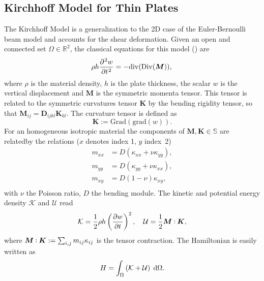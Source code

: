 \documentclass[letterpaper, 10 pt, conference]{ieeeconf}
\def\onedot{$\mathsurround0pt\ldotp$}
\def\cddot{%
	\mathbin{\vcenter{\baselineskip.67ex
			\hbox{\onedot}\hbox{\onedot}}%
}}
\begin{document}
\subsection{Kirchhoff Model for Thin Plates}
\label{subsec:classMin}
The Kirchhoff Model is a generalization to the 2D case of the Euler-Bernoulli beam model and accounts for the shear deformation. Given an open and connected set $\Omega \in \mathbb{R}^2$, the classical equations for this model (\cite{timoshenko1959theory}) are 
\begin{equation}
\displaystyle \rho h \diffp[2]{w}{t} = -\mathrm{div}(\mathrm{Div}(\bm{M})), \\
\end{equation}
where $\rho$ is the material density, $h$ is the plate thickness, the scalar $w$ is the vertical displacement and $\bm{M}$ is the symmetric momenta tensor.  This tensor is related to the symmetric curvatures tensor $\bm{K}$ by the bending rigidity tensor, so that $\bm{M}_{ij} = \bm{D}_{ijkl} \bm{K}_{kl}$. The curvature tensor is defined as
\begin{equation*}
\bm{K} := \mathrm{Grad}(\mathrm{grad}(w)).
\end{equation*}
For an homogeneous isotropic material the components of $\bm{M}, \bm{K} \in \mathbb{S}$ are relatedby the relations ($x$ denotes index 1, $y$ index~2)
\begin{equation*}
\begin{aligned}
m_{xx} &= D\left(\kappa_{xx} + \nu \kappa_{yy}\right),\\
m_{yy} &= D\left(\kappa_{yy} + \nu \kappa_{xx}\right),\\
m_{xy} &= D(1 - \nu) \kappa_{xy}, \\
\end{aligned}
\end{equation*}
with $\nu$ the Poisson ratio, $D$ the bending module. The kinetic and potential energy density $\mathcal{K}$ and $\mathcal{U}$ read
\begin{equation}
\mathcal{K} =  \frac{1}{2}\rho h \left(\diffp{w}{t} \right)^2, \quad
\mathcal{U} = \frac{1}{2} \bm{M} \cddot \bm{K},
\end{equation} 
where $\bm{M} \cddot \bm{K} := \sum_{i,j} m_{ij} \kappa_{ij}$ is the tensor contraction. The Hamiltonian  is easily written as
\begin{equation} 
H = \int_{\Omega} \left( \mathcal{K} + \mathcal{U} \right)   \d\Omega. 
\end{equation}
\end{document}
